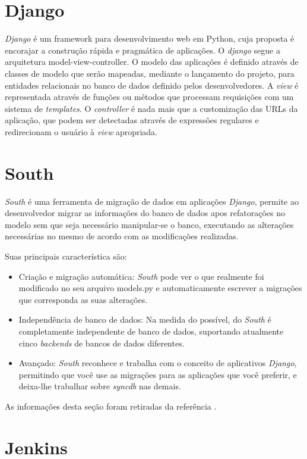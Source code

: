 \documentclass{abnt}
\begin{document}
	\section{Django}
		\emph{Django} é um framework para desenvolvimento web em Python, cuja proposta
		é encorajar a construção rápida e pragmática de aplicações.\cite{DJANGOSITE}
		O \emph{django} segue a arquitetura model-view-controller. O modelo das aplicações
		é definido através de classes de modelo que serão mapeadas, mediante o lançamento do projeto,
		para entidades relacionais no banco de dados definido pelos desenvolvedores. A \emph{view} é
		representada através de funções ou métodos que processam requisições com um sistema
		de \emph{templates}. O \emph{controller} é nada mais que a customização das URLs da aplicação,
		que podem ser detectadas através de expressões regulares e redirecionam o
		usuário à \emph{view} apropriada.\cite{DJANGOWIKIPEDIA}
	
	\section{South}
		\emph{South} é uma ferramenta de migração de dados em aplicações \emph{Django}, 
		permite ao desenvolvedor migrar as informações do banco de dados apos refatorações no modelo
		sem que seja necessário manipular-se o banco, executando as alterações necessárias 
		no mesmo de acordo com as modificações realizadas.
				
		Suas principais característica são: 
			\begin{itemize}
			\item Criação e migração automática: \emph{South} pode ver o que realmente foi modificado no seu arquivo models.py
			 e automaticamente escrever a migrações que corresponda as suas alterações.
			\item Independência de banco de dados: Na medida do possível, do \emph{South} é completamente independente 
			de banco de dados, suportando atualmente cinco \emph{backends} de bancos de dados diferentes.
			\item Avançado: \emph{South} reconhece e trabalha com o conceito de aplicativos \emph{Django}, permitindo que você use 
			as migrações para as aplicações que você preferir, e deixa-lhe trabalhar sobre \emph{syncdb} nas demais.
			\end{itemize}
			
		As informações desta seção foram retiradas da referência \cite{SOUTH}.
	
	\section{Jenkins}
			
\end{document}
